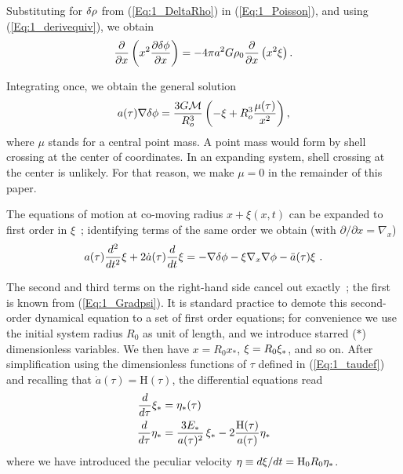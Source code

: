 Substituting for $\delta\rho$ from (\ref{Eq:1_DeltaRho}) in (\ref{Eq:1_Poisson}), and using (\ref{Eq:1_derivequiv}), we obtain
\begin{equation}
\frac{\partial}{\partial x} \left( x^2 \frac{\partial \delta\phi}{\partial x} \right) = - 4\pi a^2 G \rho_0 \frac{\partial}{\partial x} \left( x^2 \xi \right).
\end{equation}

Integrating once, we obtain the general solution
\begin{equation}
\label{Eq:1_Gradpsi} 
a(\tau)\nabla \delta\phi = \frac{3G{\cal M}}{R_o^3} \left( - \xi + R_o^3\frac{\mu(\tau)}{x^2} \right),
\end{equation}
where $\mu$ stands for a central point mass. A point mass would form by shell crossing at the center of coordinates. In an expanding system, shell crossing at the center is unlikely. For that reason, we make $ \mu = 0$ in the remainder of this paper.

The equations of motion at co-moving radius $x +\xi(x,t)$ can be expanded to first order in $\xi$~; identifying terms of the same order we obtain (with $\partial/\partial x = \nabla_x$)
\begin{equation} 
a(\tau) \frac{d^2}{d t^2} \xi + 2 \dot{a}(\tau) \frac{d}{dt}\xi = - \nabla\delta\phi - \xi \nabla_x \nabla\phi - \ddot{a}(\tau)\xi \ . 
\end{equation} 

The second and third terms on the right-hand side cancel out exactly~; the first is known from (\ref{Eq:1_Gradpsi}). It is standard practice to demote this second-order dynamical equation to a set of first order equations; for convenience we use the initial system radius $R_0$ as unit of length,  and we introduce starred ($\ast$) dimensionless variables. We then have $x = R_0 x_\ast$,  $\xi = R_0\xi_\ast$, and so on.  After simplification using the dimensionless functions of $\tau$  defined in (\ref{Eq:1_taudef}) and recalling that $\dot{a}(\tau) = \textrm{H}(\tau)$, the differential equations read
\begin{subequations}
 \label{Eq:1_system}
    \begin{align}
    	\label{Eq:1_systema}
		\frac{d}{d\tau} \xi_\ast &=  \eta_\ast(\tau)  \\ 
		\label{Eq:1_systemb}
		\frac{d}{d\tau} \eta_\ast &= \frac{3 E_\ast}{a(\tau)^2}\,\xi_\ast - 2 		\frac{\textrm{H}(\tau)}{a(\tau)} \eta_\ast   
	\end{align}
\end{subequations}
where we have introduced the peculiar velocity $\eta \equiv d\xi/dt = {\textrm{H}}_0R_0 \eta_\ast$.  


